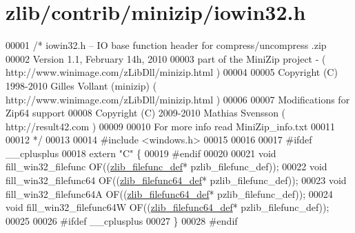 \hypertarget{zlib_2contrib_2minizip_2iowin32_8h_source}{}\section{zlib/contrib/minizip/iowin32.h}
\label{zlib_2contrib_2minizip_2iowin32_8h_source}

\begin{DoxyCode}
00001 \textcolor{comment}{/* iowin32.h -- IO base function header for compress/uncompress .zip}
00002 \textcolor{comment}{     Version 1.1, February 14h, 2010}
00003 \textcolor{comment}{     part of the MiniZip project - ( http://www.winimage.com/zLibDll/minizip.html )}
00004 \textcolor{comment}{}
00005 \textcolor{comment}{         Copyright (C) 1998-2010 Gilles Vollant (minizip) ( http://www.winimage.com/zLibDll/minizip.html )}
00006 \textcolor{comment}{}
00007 \textcolor{comment}{         Modifications for Zip64 support}
00008 \textcolor{comment}{         Copyright (C) 2009-2010 Mathias Svensson ( http://result42.com )}
00009 \textcolor{comment}{}
00010 \textcolor{comment}{         For more info read MiniZip\_info.txt}
00011 \textcolor{comment}{}
00012 \textcolor{comment}{*/}
00013 
00014 \textcolor{preprocessor}{#include <windows.h>}
00015 
00016 
00017 \textcolor{preprocessor}{#ifdef \_\_cplusplus}
00018 \textcolor{keyword}{extern} \textcolor{stringliteral}{"C"} \{
00019 \textcolor{preprocessor}{#endif}
00020 
00021 \textcolor{keywordtype}{void} fill\_win32\_filefunc OF((\hyperlink{structzlib__filefunc__def__s}{zlib\_filefunc\_def}* pzlib\_filefunc\_def));
00022 \textcolor{keywordtype}{void} fill\_win32\_filefunc64 OF((\hyperlink{structzlib__filefunc64__def__s}{zlib\_filefunc64\_def}* pzlib\_filefunc\_def));
00023 \textcolor{keywordtype}{void} fill\_win32\_filefunc64A OF((\hyperlink{structzlib__filefunc64__def__s}{zlib\_filefunc64\_def}* pzlib\_filefunc\_def));
00024 \textcolor{keywordtype}{void} fill\_win32\_filefunc64W OF((\hyperlink{structzlib__filefunc64__def__s}{zlib\_filefunc64\_def}* pzlib\_filefunc\_def));
00025 
00026 \textcolor{preprocessor}{#ifdef \_\_cplusplus}
00027 \}
00028 \textcolor{preprocessor}{#endif}
\end{DoxyCode}
